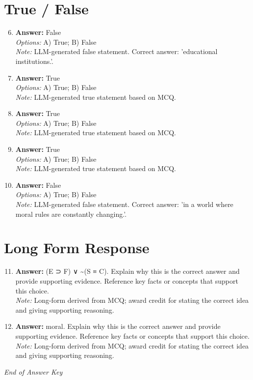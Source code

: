 \documentclass[12pt]{article}
\begin{document}
\section*{True / False}
\begin{enumerate}[label=\arabic*.]
\setcounter{enumi}{5}
\item \textbf{Answer:} False
\\ \textit{Options:} A) True; B) False
\\ \textit{Note:} LLM-generated false statement. Correct answer: 'educational institutions.'.
\item \textbf{Answer:} True
\\ \textit{Options:} A) True; B) False
\\ \textit{Note:} LLM-generated true statement based on MCQ.
\item \textbf{Answer:} True
\\ \textit{Options:} A) True; B) False
\\ \textit{Note:} LLM-generated true statement based on MCQ.
\item \textbf{Answer:} True
\\ \textit{Options:} A) True; B) False
\\ \textit{Note:} LLM-generated true statement based on MCQ.
\item \textbf{Answer:} False
\\ \textit{Options:} A) True; B) False
\\ \textit{Note:} LLM-generated false statement. Correct answer: 'in a world where moral rules are constantly changing.'.
\end{enumerate}

\section*{Long Form Response}
\begin{enumerate}[label=\arabic*.]
\setcounter{enumi}{10}
\item \textbf{Answer:} (E ⊃ F) ∨ \textasciitilde{}(S ≡ C). Explain why this is the correct answer and provide supporting evidence. Reference key facts or concepts that support this choice.
\\ \textit{Note:} Long-form derived from MCQ; award credit for stating the correct idea and giving supporting reasoning.
\item \textbf{Answer:} moral. Explain why this is the correct answer and provide supporting evidence. Reference key facts or concepts that support this choice.
\\ \textit{Note:} Long-form derived from MCQ; award credit for stating the correct idea and giving supporting reasoning.
\end{enumerate}

\vfill
\noindent\textit{End of Answer Key}
\end{document}

